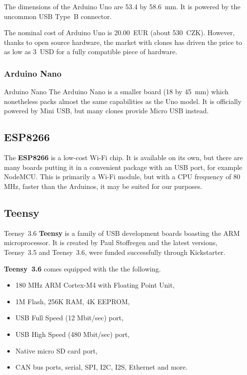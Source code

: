                 The dimensions of the Arduino Uno are 53.4 by 58.6~mm.  It is powered by the uncommon USB Type~B connector.
                
                The nominal cost of Arduino Uno is 20.00~EUR (about 530~CZK)\cite{arduino-uno-store}.  However, thanks to open source hardware, the market with clones has driven the price to as low as 3~USD for a fully compatible piece of hardware\cite{arduino-aliexpress-uno-clone}.
            
            \subsubsection{Arduino Nano}
                    {Arduino Nano \cite{arduino-nano-robotics}}
                The Arduino Nano is a smaller board (18 by 45~mm) which nonetheless packs almost the same capabilities as the Uno model\cite{arduino-nano}.  It is officially powered by Mini USB, but many clones provide Micro USB instead.
                    
            
        \subsection{ESP8266}
            The \textbf{ESP8266} is a low-cost Wi-Fi chip\cite{espressif-esp8266}.  It is available on its own, but there are many boards putting it in a convenient package with an USB port, for example NodeMCU\cite{nodemcu}.  This is primarily a Wi-Fi module, but with a CPU frequency of 80 MHz\cite{platformio-esp8266}, faster than the Arduinos, it may be suited for our purposes.
        \subsection{Teensy}
                {Teensy~3.6 \cite{teensy-36-sparkfun}}
            \textbf{Teensy} is a family of USB development boards boasting the ARM microprocessor.  It is created by Paul Stoffregen and the latest versions, Teensy~3.5 and Teensy~3.6, were funded successfully through Kickstarter\cite{teensy-35-36-kickstarter}.
            
            \textbf{Teensy~3.6} comes equipped with the the following.
            
            \begin{itemize}
                \item 180 MHz ARM Cortex-M4 with Floating Point Unit,
                \item 1M Flash, 256K RAM, 4K EEPROM,
                \item USB Full Speed (12 Mbit/sec) port,
                \item USB High Speed (480 Mbit/sec) port,
                \item Native micro SD card port,
                \item CAN bus ports, serial, SPI, I2C, I2S, Ethernet and more.
            \end{itemize}
            
